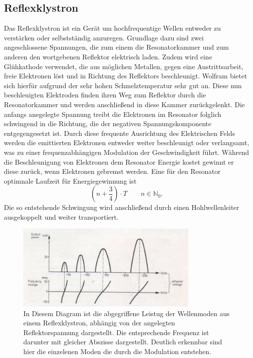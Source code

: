 \subsection{Reflexklystron}

Das Reflexklystron ist ein Gerät um hochfrequentige Wellen entweder zu verstärken oder selbstständig anzuregen. Grundlage dazu sind zwei angeschlossene Spannungen, 
die zum einem die Resonatorkammer und zum anderen den wortgebenen Reflektor elektrisch laden. Zudem wird eine Glühkathode verwendet, die aus möglichen Metallen, 
gegen eine Austrittsarbeit, freie Elektronen löst und in Richtung des Reflektors beschleunigt. Wolfram bietet sich hierfür aufgrund der sehr hohen Schmelztemperatur sehr gut an.
Diese nun beschleuigten Elektroden finden ihren Weg zum Reflektor durch die Resonatorkammer und werden anschließend in diese Kammer zurückgelenkt. Die anfangs anegelegte Spannung treibt 
die Elektronen im Resonator folglich schwingend in die Richtung, die der negativen Spannungskomponente entgegengesetzt ist. Durch diese frequente Ausrichtung des Elektrischen Felds werden die emittierten Elektronen entweder weiter beschleunigt oder 
verlangsamt, was zu einer frequenzabhängigen Modulation der Geschwindigkeit führt. Während die Beschleunigung von Elektronen dem Resonator Energie kostet gewinnt er diese zurück, wenn Elektronen gebremst werden. 
Eine für den Resonator optimnale Laufzeit für Energiegewinnung ist 
\begin{equation}
    \left(n+ \frac{3}{4} \right) \cdot T  \quad \quad n \in \mathbb{N}_0.
\end{equation}
Die so entstehende Schwingung wird anschließend durch einen Hohlwellenleiter ausgekoppelt und weiter transportiert.
\begin{figure}
    \centering
    \includegraphics[width=0.8\textwidth]{bilder/dia.jpg}
    \caption{In Diesem Diagram ist die abgegriffene Leistug der Wellenmoden aus einem Reflexklystron, abhängig von der angelegten Reflektorspannung dargestellt.
    Die entsprechende Frequenz ist darunter mit gleicher Abszisse dargestellt. Deutlich erkennbar sind hier die einzelenen Moden die durch die Modulation entstehen.} 
    \label{fig:ref}
\end{figure}
